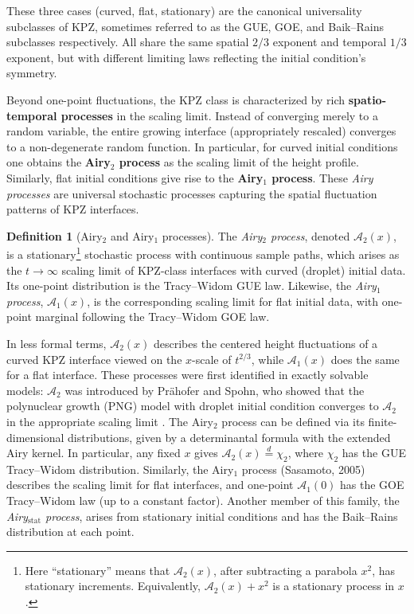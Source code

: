 \documentclass[letterpaper,11pt,oneside,reqno]{article}
\numberwithin{equation}{section}
\theoremstyle{definition}
\newtheorem{definition}[proposition]{Definition}
\begin{document}
These three cases (curved, flat, stationary) are the canonical universality subclasses of KPZ, sometimes referred to as the GUE, GOE, and Baik--Rains subclasses respectively. All share the same spatial $2/3$ exponent and temporal $1/3$ exponent, but with different limiting laws reflecting the initial condition's symmetry.

Beyond one-point fluctuations, the KPZ class is characterized by rich \textbf{spatio-temporal processes} in the scaling limit. Instead of converging merely to a random variable, the entire growing interface (appropriately rescaled) converges to a non-degenerate random function. In particular, for curved initial conditions one obtains the \textbf{Airy$_2$ process} as the scaling limit of the height profile. Similarly, flat initial conditions give rise to the \textbf{Airy$_1$ process}. These \emph{Airy processes} are universal stochastic processes capturing the spatial fluctuation patterns of KPZ interfaces.

\begin{definition}[Airy$_2$ and Airy$_1$ processes]
The \emph{Airy$_2$ process}, denoted $\mathcal{A}_2(x)$, is a stationary\footnote{Here ``stationary'' means that $\mathcal{A}_2(x)$, after subtracting a parabola $x^2$, has stationary increments. Equivalently, $\mathcal{A}_2(x) + x^2$ is a stationary process in $x$.} stochastic process with continuous sample paths, which arises as the $t\to\infty$ scaling limit of KPZ-class interfaces with curved (droplet) initial data. Its one-point distribution is the Tracy--Widom GUE law. Likewise, the \emph{Airy$_1$ process}, $\mathcal{A}_1(x)$, is the corresponding scaling limit for flat initial data, with one-point marginal following the Tracy--Widom GOE law.
\end{definition}

\noindent In less formal terms, $\mathcal{A}_2(x)$ describes the centered height fluctuations of a curved KPZ interface viewed on the $x$-scale of $t^{2/3}$, while $\mathcal{A}_1(x)$ does the same for a flat interface. These processes were first identified in exactly solvable models: $\mathcal{A}_2$ was introduced by Prähofer and Spohn, who showed that the polynuclear growth (PNG) model with droplet initial condition converges to $\mathcal{A}_2$ in the appropriate scaling limit \cite{remenik2023integrable}. The Airy$_2$ process can be defined via its finite-dimensional distributions, given by a determinantal formula with the extended Airy kernel. In particular, any fixed $x$ gives $\mathcal{A}_2(x)\stackrel{d}{=}\chi_2$, where $\chi_2$ has the GUE Tracy--Widom distribution. Similarly, the Airy$_1$ process (Sasamoto, 2005) describes the scaling limit for flat interfaces, and one-point $\mathcal{A}_1(0)$ has the GOE Tracy--Widom law (up to a constant factor). Another member of this family, the \emph{Airy$_{\mathrm{stat}}$ process}, arises from stationary initial conditions and has the Baik--Rains distribution at each point.
\end{document}
